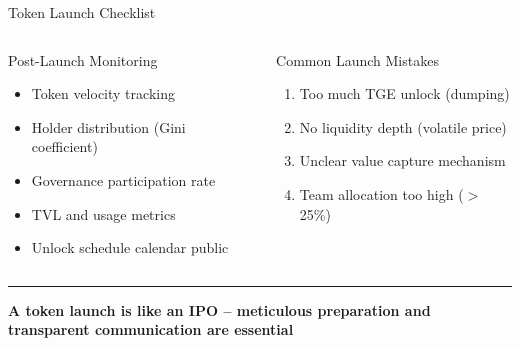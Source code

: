 \documentclass[8pt,aspectratio=169]{beamer}
\newcommand{\bottomnote}[1]{\vfill\vspace{-2mm}\textcolor{mllavender2}{\rule{\textwidth}{0.4pt}}\vspace{1mm}\footnotesize\textbf{#1}}
\begin{document}
\begin{frame}{Token Launch Checklist}
\begin{columns}[T]
\begin{block}{Post-Launch Monitoring}
\footnotesize
\begin{itemize}
  \item[\checkmark] Token velocity tracking
  \item[\checkmark] Holder distribution (Gini coefficient)
  \item[\checkmark] Governance participation rate
  \item[\checkmark] TVL and usage metrics
  \item[\checkmark] Unlock schedule calendar public
\end{itemize}
\end{block}
\vspace{2mm}
\begin{alertblock}{\footnotesize Common Launch Mistakes}
\footnotesize
\begin{enumerate}
  \item Too much TGE unlock (dumping)
  \item No liquidity depth (volatile price)
  \item Unclear value capture mechanism
  \item Team allocation too high ($>$25\%)
\end{enumerate}
\end{alertblock}
\end{columns}
\bottomnote{A token launch is like an IPO -- meticulous preparation and transparent communication are essential}
\end{frame}
\end{document}
